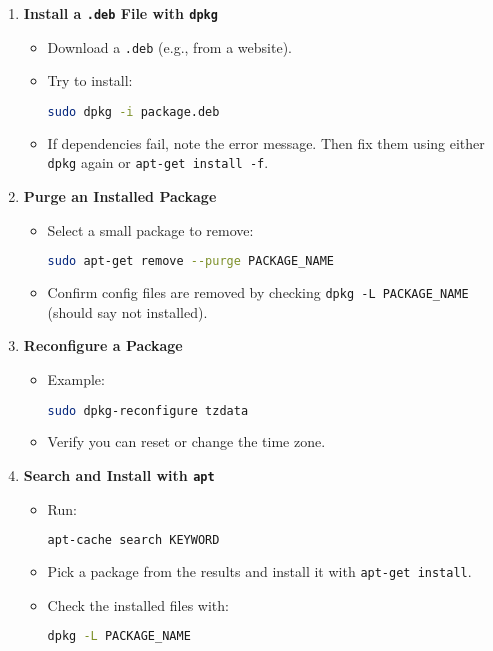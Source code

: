 \documentclass[12pt,a4paper]{report}
\begin{document}
\begin{enumerate}
    \item \textbf{Install a \texttt{.deb} File with \texttt{dpkg}}
    \begin{itemize}
        \item Download a \texttt{.deb} (e.g., from a website).
        \item Try to install:
        \begin{lstlisting}[language=bash]
sudo dpkg -i package.deb
        \end{lstlisting}
        \item If dependencies fail, note the error message. Then fix them using either \texttt{dpkg} again or \texttt{apt-get install -f}.
    \end{itemize}

    \item \textbf{Purge an Installed Package}
    \begin{itemize}
        \item Select a small package to remove:
        \begin{lstlisting}[language=bash]
sudo apt-get remove --purge PACKAGE_NAME
        \end{lstlisting}
        \item Confirm config files are removed by checking \texttt{dpkg -L PACKAGE\_NAME} (should say not installed).
    \end{itemize}

    \item \textbf{Reconfigure a Package}
    \begin{itemize}
        \item Example:
        \begin{lstlisting}[language=bash]
sudo dpkg-reconfigure tzdata
        \end{lstlisting}
        \item Verify you can reset or change the time zone.
    \end{itemize}

    \item \textbf{Search and Install with \texttt{apt}}
    \begin{itemize}
        \item Run:
        \begin{lstlisting}[language=bash]
apt-cache search KEYWORD
        \end{lstlisting}
        \item Pick a package from the results and install it with \texttt{apt-get install}.
        \item Check the installed files with:
        \begin{lstlisting}[language=bash]
dpkg -L PACKAGE_NAME
        \end{lstlisting}
    \end{itemize}


\end{enumerate}
\end{document}
